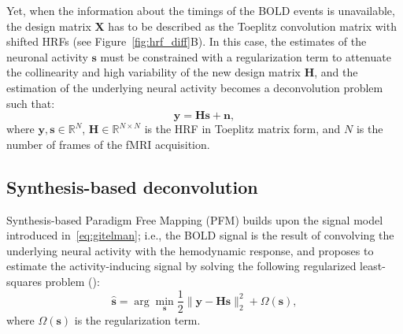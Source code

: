 Yet, when the information about the timings of the BOLD events is unavailable, the design matrix \(\mathbf{X}\) has to be described as the Toeplitz convolution matrix with shifted HRFs (see Figure~\ref{fig:hrf_diff}B). In this case, the estimates of the neuronal activity \(\mathbf{s}\) must be constrained with a regularization term to attenuate the collinearity and high variability of the new design matrix \(\mathbf{H}\), and the estimation of the underlying neural activity becomes a deconvolution problem such that:
\begin{equation}
    \label{eq:deconvolution}
    \mathbf{y} = \mathbf{Hs} + \mathbf{n},
\end{equation}
where \(\mathbf{y, s} \in \mathbb{R}^N\), \(\mathbf{H} \in \mathbb{R}^{N \times N}\) is the HRF in Toeplitz matrix form, and \(N\) is the number of frames of the fMRI acquisition.


\subsection{Synthesis-based deconvolution}

Synthesis-based Paradigm Free Mapping (PFM) builds upon the signal model introduced in~\eqref{eq:gitelman}; i.e., the BOLD signal is the result of convolving the underlying neural activity with the hemodynamic response, and proposes to estimate the activity-inducing signal by solving the following regularized least-squares problem (\citealt{caballerogaudes2013ParadigmFreeMapping,urunuela2020StabilityBasedSparseParadigm,gaudes2011DetectionCharacterizationSingletrial}):
\begin{equation}
    \label{eq:pfm}
    \hat{\mathbf{s}} = \arg \min_{\mathbf{s}} \frac{1}{2} \| \mathbf{y} - \mathbf{Hs} \|_2^2 + \Omega(\mathbf{s}),
\end{equation}
where \(\Omega(\mathbf{s})\) is the regularization term.

